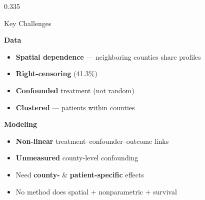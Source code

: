 \documentclass[final]{beamer}
\begin{document}
\begin{frame}[fragile]
\begin{columns}[T]
\begin{column}{0.335\textwidth}
\vspace{4pt}

\begin{posterblock}{Key Challenges}
\begin{minipage}[t]{0.47\textwidth}
{\color{FSUgarnet}\textbf{Data}}
\begin{itemize}
\item[$\triangleright$] \textbf{Spatial dependence} --- neighboring counties share profiles
\item[$\triangleright$] \textbf{Right-censoring} (41.3\%)
\item[$\triangleright$] \textbf{Confounded} treatment (not random)
\item[$\triangleright$] \textbf{Clustered} --- patients within counties
\end{itemize}
\end{minipage}\hfill
\begin{minipage}[t]{0.50\textwidth}
{\color{FSUgarnet}\textbf{Modeling}}
\begin{itemize}
\item[$\triangleright$] \textbf{Non-linear} treatment--confounder--outcome links
\item[$\triangleright$] \textbf{Unmeasured} county-level confounding
\item[$\triangleright$] Need \textbf{county-} \& \textbf{patient-specific} effects
\item[$\triangleright$] No method does spatial $+$ nonparametric $+$ survival
\end{itemize}
\end{minipage}
\end{posterblock}

\vspace{4pt}


\end{column}
\end{columns}
\end{frame}
\end{document}
